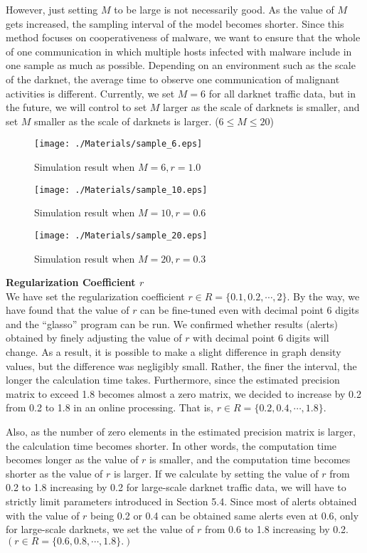 \documentclass{sig-alternate-10pt}
\begin{document}
However, just setting $M$ to be large is not necessarily good.
As the value of $M$ gets increased, the sampling interval of the model becomes shorter.
Since this method focuses on cooperativeness of malware, we want to ensure that the whole of one communication in which multiple hosts infected with malware include in one sample as much as possible.
Depending on an environment such as the scale of the darknet, the average time to observe one communication of malignant activities is different.
Currently, we set $M=6$ for all darknet traffic data, but in the future, we will control to set $M$ larger as the scale of darknets is smaller, and set $M$ smaller as the scale of darknets is larger. ($6 \leq M \leq 20$)

\begin{figure}[htb]
	\texttt{[image: ./Materials/sample\_6.eps]}
	\caption{Simulation result when $M = 6, r=1.0$}
  	\label{fig:M6}
	\vspace*{0.3cm}
	\texttt{[image: ./Materials/sample\_10.eps]}
	\caption{Simulation result when $M = 10, r=0.6$}
  	\label{fig:M10}
	\vspace*{0.3cm}
	\texttt{[image: ./Materials/sample\_20.eps]}
	\caption{Simulation result when $M = 20, r=0.3$}
  	\label{fig:M20}
\end{figure}

\vspace*{0.3 cm}
\noindent
\textbf{Regularization Coefficient $r$}\\
We have set the regularization coefficient $r \in R=\{0.1, 0.2, \cdots, 2\}$.
By the way, we have found that the value of $r$ can be fine-tuned even with decimal point 6 digits and the ``glasso'' program can be run.
We confirmed whether results (alerts) obtained by finely adjusting the value of $r$ with decimal point 6 digits will change.
As a result, it is possible to make a slight difference in graph density values, but the difference was negligibly small.
Rather, the finer the interval, the longer the calculation time takes.
Furthermore, since the estimated precision matrix to exceed 1.8 becomes almost a zero matrix, we decided to increase by 0.2 from 0.2 to 1.8 in an online processing.
That is, $r \in R=\{0.2, 0.4, \cdots, 1.8\}$.

Also, as the number of zero elements in the estimated precision matrix is larger, the calculation time becomes shorter.
In other words, the computation time becomes longer as the value of $r$ is smaller, and the computation time becomes shorter as the value of $r$ is larger.
If we calculate by setting the value of $r$ from 0.2 to 1.8 increasing by 0.2 for large-scale darknet traffic data, we will have to strictly limit parameters introduced in Section 5.4.
Since most of alerts obtained with the value of $r$ being 0.2 or 0.4 can be obtained same alerts even at 0.6, only for large-scale darknets, we set the value of $r$ from 0.6 to 1.8 increasing by 0.2. $(r \in R=\{0.6, 0.8, \cdots, 1.8\}.)$
\end{document}
